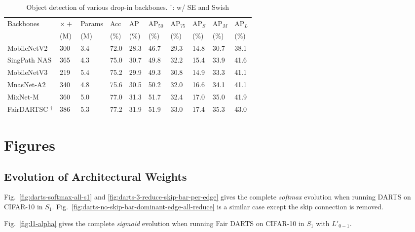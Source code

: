 \documentclass[runningheads]{llncs}
\begin{document}
\setlength{\tabcolsep}{4pt}
\begin{table}
	\begin{center}
		\caption{Object detection of various drop-in backbones. $^{\dagger}$: w/ SE and Swish}
		\label{table:fairdarts-coco-retina}
		\begin{tabular}{llllllllll}
			\hline\noalign{\smallskip}
			Backbones & $\times +$  & Params &Acc    & AP & AP$_{50}$ & AP$_{75}$ & AP$_S$ & AP$_M$ & AP$_L$ \\
& (M) & (M) & (\%) &(\%) & (\%)& (\%)&(\%) &(\%) &(\%) \\
			\hline\noalign{\smallskip}
			MobileNetV2 \cite{sandler2018mobilenetv2} & 300 & 3.4& 72.0 & 28.3 & 46.7 & 29.3 & 14.8 & 30.7 & 38.1\\
			SingPath NAS \cite{stamoulis2019single} & 365 & 4.3 & 75.0 & 30.7 & 49.8 & 32.2 & 15.4 &33.9 & 41.6\\
MobileNetV3 \cite{howard2019searching} & 219 & 5.4 & 75.2& 29.9 & 49.3 & 30.8 & 14.9 & 33.3 & 41.1\\
			MnasNet-A2 \cite{tan2018mnasnet} & 340& 4.8 & 75.6 & 30.5 & 50.2 & 32.0 & 16.6 & 34.1 & 41.1\\
			MixNet-M \cite{tan2020mixconv} & 360 & 5.0 & 77.0 & 31.3& 51.7 & 32.4& 17.0 & 35.0 & 41.9   \\
			FairDARTSC  $^{\dagger}$ & 386 &5.3 & 77.2 & 31.9 & 51.9 & 33.0 & 17.4 & 35.3 & 43.0  \\
\hline
		\end{tabular}
	\end{center}
\end{table}



\section{Figures}

\subsection{Evolution of Architectural Weights}
Fig.~\ref{fig:darts-softmax-all-s1} and \ref{fig:darts-3-reduce-skip-bar-per-edge} gives the complete \emph{softmax} evolution when running DARTS on CIFAR-10 in $S_1$. Fig.~\ref{fig:darts-no-skip-bar-dominant-edge-all-reduce} is a similar case except the skip connection is removed. 

Fig.~\ref{fig:l1-alpha} gives the complete \emph{sigmoid} evolution when running Fair DARTS on CIFAR-10 in $S_1$ with $L'_{0-1}$.
\end{document}
